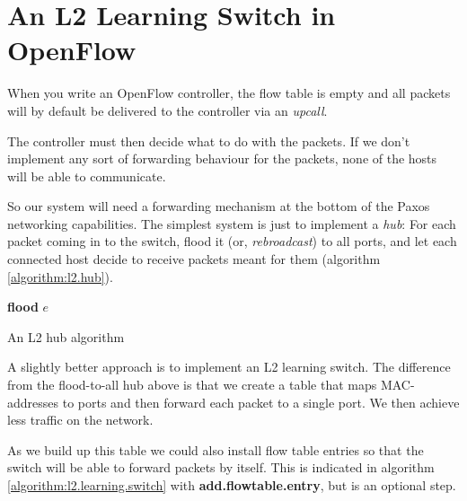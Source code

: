 \section{An L2 Learning Switch in OpenFlow}
\label{chapter:l2.learning.switch}

When you write an OpenFlow controller, the flow table is empty and all
packets will by default be delivered to the controller via an
\textit{upcall}.

The controller must then decide what to do with the packets.  If we don't
implement any sort of forwarding behaviour for the packets, none of the
hosts will be able to communicate.

So our system will need a forwarding mechanism at the bottom of the Paxos
networking capabilities.  The simplest system is just to implement a
\textit{hub}:  For each packet coming in to the switch, flood it
(or, \textit{rebroadcast}) to all ports, and let each
connected host decide to receive packets meant for them (algorithm
\ref{algorithm:l2.hub}).

\begin{algorithm}
  \begin{algorithmic}
      \State \textbf{flood} $e$ 
    \EndOn
  \end{algorithmic}
  \caption{An L2 hub algorithm}
  \label{algorithm:l2.hub}
\end{algorithm}

A slightly better approach is to implement an \ac{L2} learning
switch.
The difference from the flood-to-all hub above is that we create a table
that maps MAC-addresses to ports and then forward each packet to a single
port.  We then achieve less traffic on the network.

As we build up this table we could also install flow table entries so that the
switch will be able to forward packets by itself.  This is indicated in
algorithm \vref{algorithm:l2.learning.switch} with
\textbf{add.flowtable.entry}, but is an optional step.

